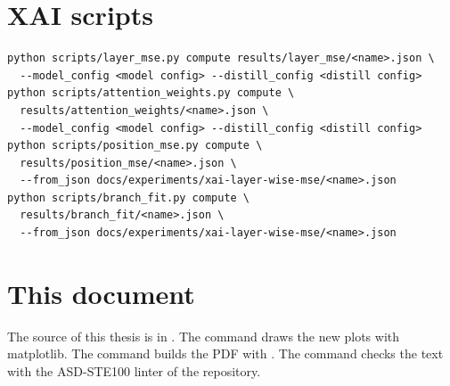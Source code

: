 \section{XAI scripts}

\begin{verbatim}
python scripts/layer_mse.py compute results/layer_mse/<name>.json \
  --model_config <model config> --distill_config <distill config>
python scripts/attention_weights.py compute \
  results/attention_weights/<name>.json \
  --model_config <model config> --distill_config <distill config>
python scripts/position_mse.py compute \
  results/position_mse/<name>.json \
  --from_json docs/experiments/xai-layer-wise-mse/<name>.json
python scripts/branch_fit.py compute \
  results/branch_fit/<name>.json \
  --from_json docs/experiments/xai-layer-wise-mse/<name>.json
\end{verbatim}

\section{This document}

The source of this thesis is in . The command  draws the new plots with matplotlib. The command  builds the PDF with . The command  checks the text with the ASD-STE100 linter of the repository.
